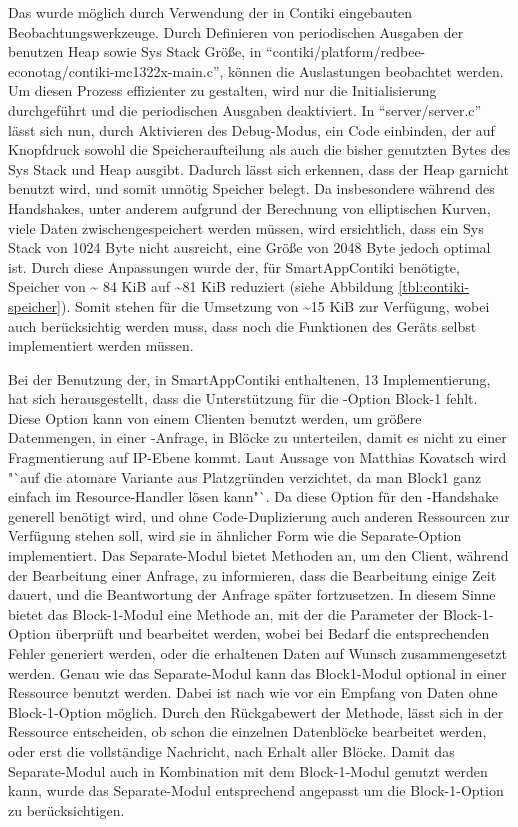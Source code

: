 Das wurde möglich durch Verwendung der in Contiki eingebauten Beobachtungswerkzeuge. Durch Definieren von periodischen Ausgaben der benutzen Heap
sowie Sys Stack Größe, in "`contiki/platform/redbee-econotag/contiki-mc1322x-main.c"', können die Auslastungen beobachtet werden. Um diesen Prozess
effizienter zu gestalten, wird nur die Initialisierung durchgeführt und die periodischen Ausgaben deaktiviert. In "`server/server.c"' lässt sich nun,
durch Aktivieren des Debug-Modus, ein Code einbinden, der auf Knopfdruck sowohl die Speicheraufteilung als auch die bisher genutzten Bytes des Sys Stack
und Heap ausgibt. Dadurch lässt sich erkennen, dass der Heap garnicht benutzt wird, und somit unnötig Speicher belegt. Da insbesondere während des Handshakes,
unter anderem aufgrund der Berechnung von elliptischen Kurven, viele Daten zwischengespeichert werden müssen, wird ersichtlich, dass ein Sys Stack von 1024
Byte nicht ausreicht, eine Größe von 2048 Byte jedoch optimal ist. Durch diese Anpassungen wurde der, für SmartAppContiki benötigte, Speicher von \textasciitilde
84 KiB auf \textasciitilde 81 KiB reduziert (siehe Abbildung \ref{tbl:contiki-speicher}). Somit stehen für die Umsetzung von  \textasciitilde 15 KiB zur
Verfügung, wobei auch berücksichtig werden muss, dass noch die Funktionen des Geräts selbst implementiert werden müssen.

Bei der Benutzung der, in SmartAppContiki enthaltenen,  13 Implementierung, hat sich herausgestellt, dass die Unterstützung für die -Option
Block-1 fehlt. Diese Option kann von einem Clienten benutzt werden, um größere Datenmengen, in einer -Anfrage, in Blöcke zu unterteilen, damit es nicht
zu einer Fragmentierung auf IP-Ebene kommt. Laut Aussage von Matthias Kovatsch wird "`auf die atomare Variante aus Platzgründen verzichtet, da man Block1 ganz
einfach im Resource-Handler lösen kann"`. Da diese Option für den -Handshake generell benötigt wird, und ohne Code-Duplizierung auch anderen Ressourcen
zur Verfügung stehen soll, wird sie in ähnlicher Form wie die Separate-Option implementiert. Das Separate-Modul bietet Methoden an, um den Client, während der
Bearbeitung einer Anfrage, zu informieren, dass die Bearbeitung einige Zeit dauert, und die Beantwortung der Anfrage später fortzusetzen. In diesem Sinne bietet
das Block-1-Modul eine Methode an, mit der die Parameter der Block-1-Option überprüft und bearbeitet werden, wobei bei Bedarf die entsprechenden Fehler generiert
werden, oder die erhaltenen Daten auf Wunsch zusammengesetzt werden. Genau wie das Separate-Modul kann das Block1-Modul optional in einer Ressource benutzt werden.
Dabei ist nach wie vor ein Empfang von Daten ohne Block-1-Option möglich. Durch den Rückgabewert der Methode, lässt sich in der Ressource entscheiden, ob schon
die einzelnen Datenblöcke bearbeitet werden, oder erst die vollständige Nachricht, nach Erhalt aller Blöcke. Damit das Separate-Modul auch in Kombination mit dem
Block-1-Modul genutzt werden kann, wurde das Separate-Modul entsprechend angepasst um die Block-1-Option zu berücksichtigen.

